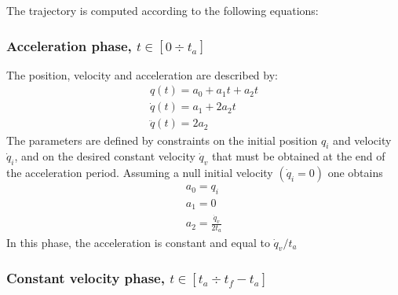 \documentclass{book}
\begin{document}
The trajectory is computed according to the following equations:
\subsubsection{Acceleration phase, $t\in[0\div t_a]$}
The position, velocity and acceleration are described by: 
\begin{gather*}
  q(t) = a_0+a_1t+a_2t\\
  \dot{q}(t)=a_1+2a_2t\\
  \ddot{q}(t)=2a_2
\end{gather*}
The parameters are defined by constraints on the initial position $q_i$ and velocity $\dot{q}_i$, and on the desired constant velocity $\dot{q}_v$ that must be obtained at the end of the acceleration period. Assuming a null initial velocity $(\dot{q}_i=0)$ one obtains 
\begin{gather*}
  a_0 = q_i\\
  a_1 = 0\\
  a_2 = \displaystyle\frac{\dot{q}_v}{2t_a}
\end{gather*}
In this phase, the acceleration is constant and equal to $\dot{q}_v/t_a$

\subsubsection{Constant velocity phase, $t\in[t_a\div t_f-t_a]$}
\end{document}
